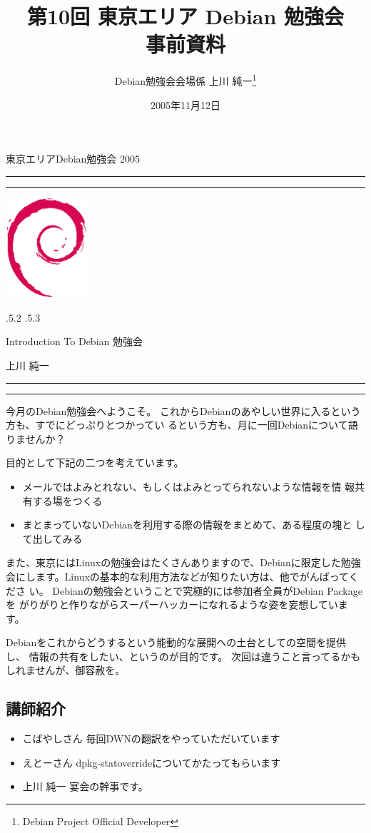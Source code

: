 \documentclass[mingoth,a4paper]{jsarticle}
\makeatletter
\renewcommand{\section}{\@startsection{section}{1}{\z@}%
    {\Cvs \@plus.5\Cdp \@minus.2\Cdp}%
    {.5\Cvs \@plus.3\Cdp}%
    {\normalfont\Large\headfont\raggedright\centering}} %
\newcommand{\dancersection}[2]{%
\newpage
東京エリアDebian勉強会 2005
\hrule
\vspace{0.5mm}
\hrule
\hfill{}\includegraphics[width=3cm]{image200502/openlogo-nd.eps}\\
\vspace{-4cm}
\begin{center}
  \section{#1}
\end{center}
\hfill{}#2\hspace{3cm}\space\\
\hrule
\hrule
\vspace{1cm}
}
\makeatother
\begin{document}
\begin{titlepage}

\title{
 第10回 東京エリア Debian 勉強会\\事前資料}
\date{2005年11月12日}
\author{Debian勉強会会場係 上川 純一\thanks{Debian Project Official Developer}} 
\maketitle
\thispagestyle{empty}

\end{titlepage}

\newpage
\tableofcontents

\dancersection{Introduction To Debian 勉強会}{上川 純一}

今月のDebian勉強会へようこそ。
これからDebianのあやしい世界に入るという方も、すでにどっぷりとつかってい
るという方も、月に一回Debianについて語りませんか？

目的として下記の二つを考えています。

\begin{itemize}
 \item メールではよみとれない、もしくはよみとってられないような情報を情
       報共有する場をつくる
 \item まとまっていないDebianを利用する際の情報をまとめて、ある程度の塊と
       して出してみる
\end{itemize}

また、東京にはLinuxの勉強会はたくさんありますので、Debianに限定した勉強
会にします。Linuxの基本的な利用方法などが知りたい方は、他でがんばってくださ
い。
Debianの勉強会ということで究極的には参加者全員がDebian Packageを
がりがりと作りながらスーパーハッカーになれるような姿を妄想しています。

Debianをこれからどうするという能動的な展開への土台としての空間を提供し、
情報の共有をしたい、というのが目的です。
次回は違うこと言ってるかもしれませんが、御容赦を。

\subsection{講師紹介}

\begin{itemize}
 \item{こばやしさん} 毎回DWNの翻訳をやっていただいています
 \item{えとーさん} dpkg-statoverrideについてかたってもらいます
 \item{上川 純一} 宴会の幹事です。
\end{itemize}
\end{document}
